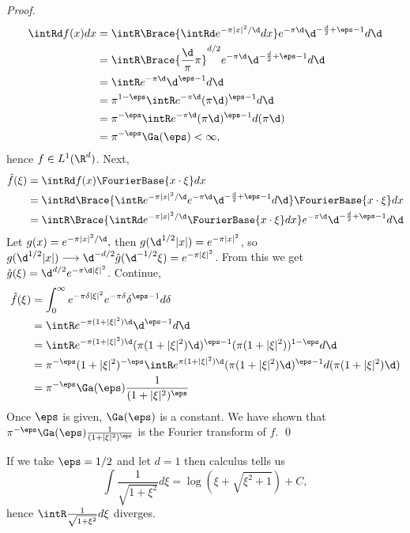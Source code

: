 \begin{proof}
    \begin{align*}
    \intRd f(x)dx
    &= \intR \Brace{\intRd e^{-\pi |x|^2/\d}dx}e^{-\pi \d}\d^{-\frac{d}{2}+\eps-1}d\d \\
    &= \intR \Brace{\frac{\d}{\pi}\pi}^{d/2}e^{-\pi \d}\d^{-\frac{d}{2}+\eps-1}d\d \\
    &= \intR e^{-\pi \d}\d^{\eps-1}d\d \\
    &= \pi^{1-\eps}\intR e^{-\pi \d}(\pi\d)^{\eps-1}d\d \\
    &= \pi^{-\eps}\intR e^{-\pi \d}(\pi\d)^{\eps-1}d(\pi\d) \\
    &= \pi^{-\eps}\Ga(\eps) < \infty,
    \end{align*}
    hence $f \in L^1(\R^d)$. Next, 
    \begin{align*}
    \hat{f}(\xi)
    &= \intRd f(x) \FourierBase{x\cdot \xi}dx \\
    &= \intRd \Brace{\intR e^{-\pi |x|^2/\d} e^{-\pi \d}\d^{-\frac{d}   {2}+\eps-1} d\d} \FourierBase{x\cdot \xi}dx \\
    &= \intR \Brace{\intRd e^{-\pi |x|^2/\d}
       \FourierBase{x\cdot \xi}dx}e^{-\pi \d} %
       \d^{-\frac{d}{2}+\eps-1} d\d \\
    \end{align*}
    Let $g(x)=e^{-\pi|x|^2/\d},$ then $g(\d^{1/2}|x|)=e^{-\pi|x|^2}$, 
    so $g(\d^{1/2}|x|) \longrightarrow \d^{-d/2}\hat{g}(\d^{-1/2}\xi) = e^{-\pi|\xi|^2}$. From this we get $\hat{g}(\xi)=\d^{d/2}e^{-\pi \d|\xi|^2}$. 
    Continue,
    \begin{align*}
    \hat{f}(\xi)
    &= \int_0^\infty e^{-\pi \delta |\xi|^2} e^{-\pi \delta} \delta^{\eps-1} d\delta \\
    &= \intR e^{-\pi(1+|\xi|^2)\d}\d^{\eps-1}d\d \\
    &= \intR e^{-\pi(1+|\xi|^2)\d}(\pi(1+|\xi|^2)\d)^{\eps-1}
       (\pi(1+|\xi|^2))^{1-\eps} d\d \\
    &= \pi^{-\eps}(1+|\xi|^2)^{-\eps} 
       \intR e^{\pi(1+|\xi|^2)\d}(\pi(1+|\xi|^2)\d)^{\eps-1} 
       d(\pi(1+|\xi|^2)\d) \\
    &= \pi^{-\eps}\Ga(\eps)\frac{1}{(1+|\xi|^2)^\eps}
    \end{align*}
    Once $\eps$ is given, $\Ga(\eps)$ is a constant. 
    We have shown that $\pi^{-\eps}\Ga(\eps)\frac{1}{(1+|\xi|^2)^\eps}$ is the Fourier transform of $f$. \qed
\end{proof}
\begin{remark}
    If we take $\eps=1/2$ and let $d=1$ 
    then calculus tells us 
    $$ \int \frac{1}{\sqrt{1+\xi^2}}d\xi 
       = \log (\xi + \sqrt{\xi^2 + 1}) + C, $$
    hence $\intR \frac{1}{\sqrt{1+\xi^2}}d\xi$ diverges. 
\end{remark}

